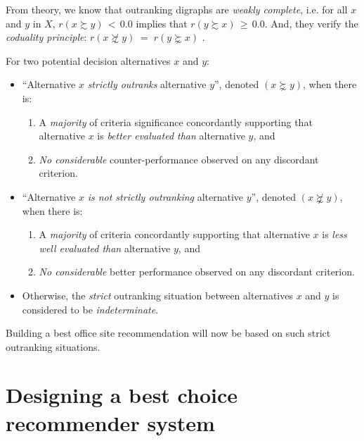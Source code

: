 From theory, we know that outranking digraphs are \emph{weakly complete}, i.e. for all $x$ and $y$ in $X$, $r(x \succsim y)\, <\, 0.0$ implies that $r(y \succsim x)\, \geq\, 0.0$. And, they verify the \emph{coduality principle}:  $r(x \not\succsim y) \;=\; r(y \succnsim x)$ \citep{BIS-2013}.

\begin{definition}\label{def:strictOutranking}

\noindent For two potential decision alternatives $x$ and $y$:
\begin{itemize}[leftmargin=0.5cm,rightmargin=0.5cm]
\item ``Alternative $x$ \emph{strictly outranks} alternative $y$'', denoted $(x \succnsim y)$, when there is:
   \begin{enumerate}[topsep=0pt]
     \item A \emph{majority} of criteria significance concordantly supporting that alternative $x$ is \emph{better evaluated than} alternative $y$, and
     \item \emph{No considerable} counter-performance observed on any discordant criterion.      
    \end{enumerate}
\item ``Alternative $x$ \emph{is not strictly outranking} alternative $y$'', denoted $(x \not\succnsim y)$, when there is:
   \begin{enumerate}[topsep=0pt]
    \item A \emph{majority} of criteria concordantly supporting that alternative $x$ is \emph{less well evaluated than} alternative $y$, and
    \item \emph{No considerable} better performance observed on any discordant criterion. 
    \end{enumerate}
\item Otherwise, the \emph{strict} outranking situation between alternatives $x$ and $y$ is considered to be \emph{indeterminate}.
\end{itemize}
\end{definition}

Building a best office site recommendation will now be based on such strict outranking situations.

\section{Designing a best choice recommender system}
\label{sec:4.4}

